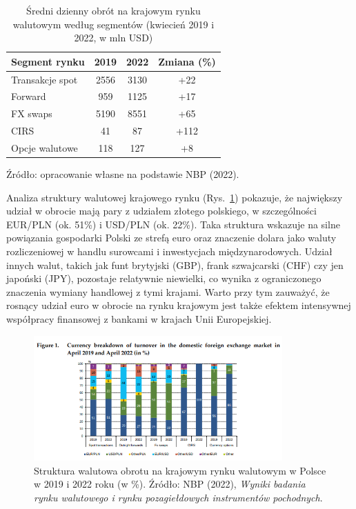 \begin{table}[h!]
\centering
\caption{Średni dzienny obrót na krajowym rynku walutowym według segmentów (kwiecień 2019 i 2022, w mln USD)}
\label{tab:nbp_segments}
\begin{tabular}{lccc}
\hline
Segment rynku & 2019 & 2022 & Zmiana (\%) \\
\hline
Transakcje spot & 2556 & 3130 & +22 \\
Forward & 959 & 1125 & +17 \\
FX swaps & 5190 & 8551 & +65 \\
CIRS & 41 & 87 & +112 \\
Opcje walutowe & 118 & 127 & +8 \\
\hline
\end{tabular}

\vspace{1mm}
{\footnotesize Źródło: opracowanie własne na podstawie NBP (2022).}
\end{table}

Analiza struktury walutowej krajowego rynku (Rys.~\ref{fig:nbp_breakdown}) pokazuje, że największy udział w obrocie mają pary z udziałem złotego polskiego, w szczególności EUR/PLN (ok. 51\%) i USD/PLN (ok. 22\%). 
Taka struktura wskazuje na silne powiązania gospodarki Polski ze strefą euro oraz znaczenie dolara jako waluty rozliczeniowej w handlu surowcami i inwestycjach międzynarodowych. 
Udział innych walut, takich jak funt brytyjski (GBP), frank szwajcarski (CHF) czy jen japoński (JPY), pozostaje relatywnie niewielki, co wynika z ograniczonego znaczenia wymiany handlowej z tymi krajami.
Warto przy tym zauważyć, że rosnący udział euro w obrocie na rynku krajowym jest także efektem intensywnej współpracy finansowej z bankami w krajach Unii Europejskiej.

\begin{figure}[h!]
  \centering
  \includegraphics[width=0.85\textwidth]{plots/nbp_fx_poland_2022_breakdown.png}
  \caption{Struktura walutowa obrotu na krajowym rynku walutowym w Polsce w 2019 i 2022 roku (w \%). Źródło: NBP (2022), \textit{Wyniki badania rynku walutowego i rynku pozagiełdowych instrumentów pochodnych}.}
  \label{fig:nbp_breakdown}
\end{figure}


